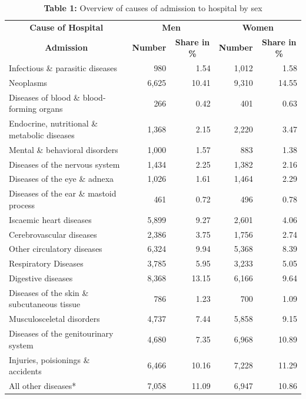 \begin{table}[H]
  \scriptsize
  \centering
  \caption*{\textbf{Table 1: }  Overview of causes of admission to hospital by sex}
    \begin{tabular}{lrrrr}
    \toprule
    \multicolumn{1}{c}{\textbf{Cause of Hospital}} & \multicolumn{2}{c}{\textbf{Men }} & \multicolumn{2}{c}{\textbf{Women}} \\
    \multicolumn{1}{c}{\textbf{Admission}} & \multicolumn{1}{c}{\textbf{Number}} & \multicolumn{1}{c}{\textbf{Share in \%}} & \multicolumn{1}{c}{\textbf{Number }} & \multicolumn{1}{c}{\textbf{Share in \%}} \\
    \midrule
    Infectious \& parasitic diseases & 980   & 1.54  & 1,012 & 1.58 \\
    Neoplasms & 6,625 & 10.41 & 9,310 & 14.55 \\
    Diseases of blood \& blood-forming organs & 266   & 0.42  & 401   & 0.63 \\
    Endocrine, nutritional \& metabolic diseases & 1,368 & 2.15  & 2,220 & 3.47 \\
    Mental \& behavioral disorders & 1,000 & 1.57  & 883   & 1.38 \\
    Diseases of the nervous system & 1,434 & 2.25  & 1,382 & 2.16 \\
    Diseases of the eye \& adnexa & 1,026 & 1.61  & 1,464 & 2.29 \\
    Diseases of the ear \& mastoid process & 461   & 0.72  & 496   & 0.78 \\
    Iscaemic heart diseases & 5,899 & 9.27  & 2,601 & 4.06 \\
    Cerebrovascular diseases & 2,386 & 3.75  & 1,756 & 2.74 \\
    Other circulatory diseases & 6,324 & 9.94  & 5,368 & 8.39 \\
    Respiratory Diseases & 3,785 & 5.95  & 3,233 & 5.05 \\
    Digestive diseases & 8,368 & 13.15 & 6,166 & 9.64 \\
    Diseases of the skin \& subcutaneous tissue & 786   & 1.23  & 700   & 1.09 \\
    Musculosceletal disorders & 4,737 & 7.44  & 5,858 & 9.15 \\
    Diseases of the genitourinary system & 4,680 & 7.35  & 6,968 & 10.89 \\
    Injuries, poisionings \& accidents & 6,466 & 10.16 & 7,228 & 11.29 \\
    All other diseases* & 7,058 & 11.09 & 6,947 & 10.86 \\

\end{tabular}
\end{table}
